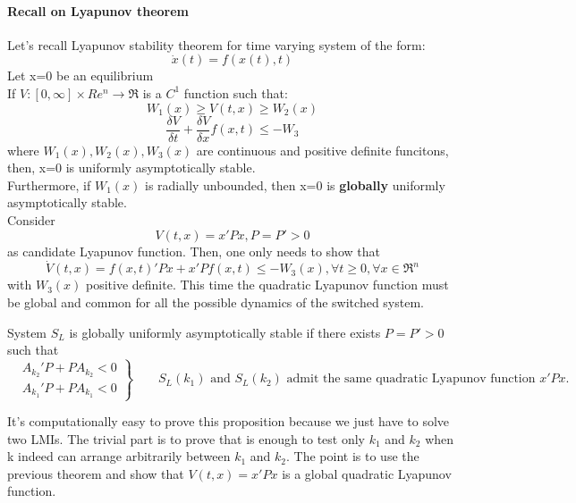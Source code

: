 \paragraph{Recall on Lyapunov theorem}
Let's recall Lyapunov stability theorem for time varying system of the form:\[\dot{x}(t)=f(x(t),t)	\]
Let x=0 be an equilibrium\\If $V\colon [0,\infty]\times 	Re^n\to\Re$ is a $C^1$ function such that:\[W_1(x)\ge V(t,x) \ge W_2(x)\]\[\frac{\delta V}{\delta t}+\frac{\delta V}{\delta x}f(x,t)\le-W_3\] where $W_1(x), W_2(x), W_3(x)$ are continuous and positive definite funcitons, then, x=0 is uniformly asymptotically stable.\\Furthermore, if $W_1(x)$ is radially unbounded, then x=0 is \textbf{globally} uniformly asymptotically stable.\\Consider\[\boxed{V(t,x)=x'Px,P=P'>0}\] as candidate Lyapunov function. Then, one only needs to show that \[\dot{V}(t,x)=f(x,t)'Px+x'Pf(x,t)\le-W_3(x),\forall t\ge 0,\forall x \in \Re^n\] with $W_3(x)$ positive definite.
This time the quadratic Lyapunov function must be global and common for all the possible dynamics of the switched system.
\begin{prop}
	System $S_L$ is globally uniformly asymptotically stable if there exists $P=P'>0$ such that
	\[
	\left.
	\begin{aligned}
		& A_{k_2}'P+PA_{k_2}<0\\
		& A_{k_1}'P+PA_{k_1}<0
	\end{aligned}
	\right\rbrace
	\qquad S_L(k_1)\text{ and }S_L(k_2) \text{ admit the same quadratic Lyapunov function } x'Px.
	\]
\end{prop}
It's computationally easy to prove this proposition because we just have to solve two LMIs. The trivial part is to prove that is enough to test only $k_1$ and $k_2$ when k indeed can arrange arbitrarily between $k_1$ and $k_2$. The point is to use the previous theorem and show that $V(t,x)=x'Px$ is a global quadratic Lyapunov function.
